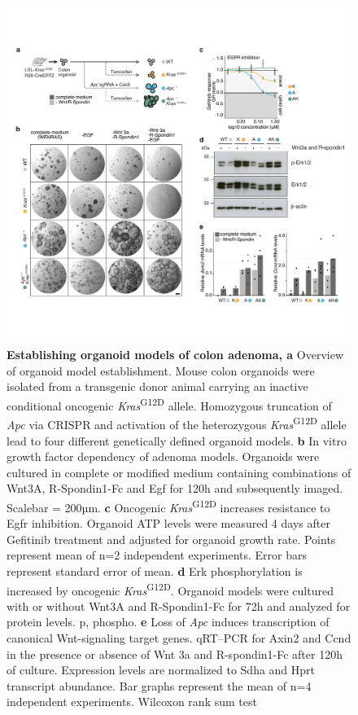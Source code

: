 \begin{flushleft}
\begin{figure}[H]
\centering
\includegraphics[width=\textwidth,
                height=\textheight,
                keepaspectratio]{figures/adenomaprofiling/pdf/fig_1_0.pdf}
\caption[Establishing organoid models of colon adenoma]{\textbf{Establishing organoid models of colon adenoma, a} Overview of organoid model establishment. Mouse colon organoids were isolated from a transgenic donor animal carrying an inactive conditional oncogenic \textit{Kras}\textsuperscript{G12D} allele. Homozygous truncation of \textit{Apc} via CRISPR and activation of the heterozygous \textit{Kras}\textsuperscript{G12D} allele lead to four different genetically defined organoid models.
\textbf{b} In vitro growth factor dependency of adenoma models. Organoids were cultured in complete or modified medium containing combinations of Wnt3A, R-Spondin1-Fc and Egf for 120h and subsequently imaged. Scalebar = 200µm.
\textbf{c}	Oncogenic \textit{Kras}\textsuperscript{G12D} increases resistance to Egfr inhibition. Organoid ATP levels were measured 4 days after Gefitinib treatment and adjusted for organoid growth rate. Points represent mean of n=2 independent experiments. Error bars represent standard error of mean.
\textbf{d} Erk phosphorylation is increased by oncogenic \textit{Kras}\textsuperscript{G12D}. Organoid models were cultured with or without Wnt3A and R-Spondin1-Fc for 72h and analyzed for protein levels. p, phospho.   
\textbf{e}	Loss of \textit{Apc} induces transcription of canonical Wnt-signaling target genes. qRT–PCR for Axin2 and Ccnd in the presence or absence of Wnt 3a and R-spondin1-Fc after 120h of culture. Expression levels are normalized to Sdha and Hprt transcript abundance. Bar graphs represent the mean of n=4 independent experiments. Wilcoxon rank sum test 
}
\label{fig_a10}
\end{figure}
\bigbreak


\end{flushleft}
